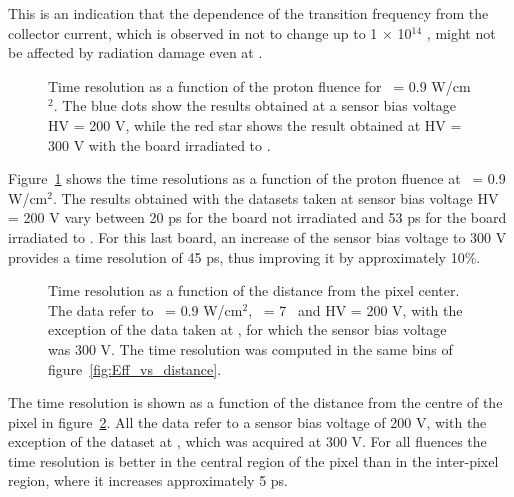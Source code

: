 		This is an indication that the dependence of the transition frequency from the collector current, which is observed in \cite{SiGeRadiationDamage} not to change up to 1 $\times$ 10$^{14}$ \flu, might not be affected by radiation damage even at \maxflu. 

		\begin{figure}[!htb]
			\centering
			\caption{\label{fig:fluence_vs_timeres} Time resolution as a function of the proton fluence for \pdensity~= 0.9 W/cm$^2$. The blue dots show the results obtained at a sensor bias voltage HV = 200 V, while the red star shows the result obtained at HV = 300 V with the board irradiated to \maxflu. }
		\end{figure}

		Figure~\ref{fig:fluence_vs_timeres} shows the time resolutions as a function of the proton fluence at \pdensity~= 0.9 W/cm$^2$. The results obtained with the datasets taken at sensor bias voltage HV = 200 V vary between 20 ps for the board not irradiated and 53 ps for the board irradiated to \maxflu. 
		For this last board, an increase of the sensor bias voltage to 300 V provides a time resolution of 45 ps, thus improving it by approximately 10\%.

		\begin{figure}[!htb]
			\centering
			\caption{\label{fig:Timeres_vs_distance}Time resolution as a function of the distance from the pixel center. The data refer to \pdensity~= 0.9 W/cm$^2$,  \vth~= 7 \sigmav~and HV = 200 V, with the exception of the data taken at \maxflu, for which the sensor bias voltage was 300 V. The time resolution was computed in the same bins of figure~\ref{fig:Eff_vs_distance}.}
		\end{figure}

		The time resolution is shown as a function of the distance from the centre of the pixel in figure~\ref{fig:Timeres_vs_distance}.
		All the data refer to a sensor bias voltage of 200 V, with the exception of the dataset at \maxflu, which was acquired at 300 V.
		For all fluences the time resolution is better in the central region of the pixel than in the inter-pixel region, where it increases approximately 5 ps.
		